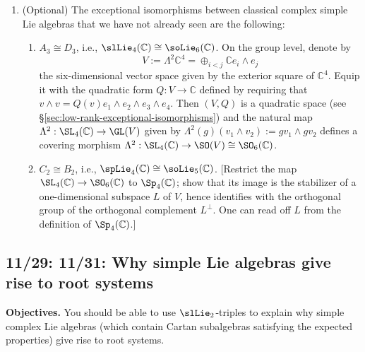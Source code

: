 \documentclass[reqno]{amsart} 
\begin{document}
\begin{homework}
\begin{enumerate}
  \item (Optional)
    The exceptional isomorphisms between
    classical complex simple Lie algebras
    that we have not already seen
    are the following:
    \begin{enumerate}
    \item $A_3 \cong D_3$, i.e.,
      $\slLie_4(\mathbb{C}) \cong \soLie_{6}(\mathbb{C})$.
      On the group level,
      denote by
      \begin{equation*}
      V := \Lambda^2 \mathbb{C}^4
      = \oplus_{i < j} \mathbb{C} e_i \wedge e_j
      \end{equation*}
      the six-dimensional vector space given by the exterior
      square of $\mathbb{C}^4$.  Equip it with the quadratic form
      $Q : V \rightarrow \mathbb{C}$
      defined by requiring that
      $v \wedge v = Q(v) e_1 \wedge e_2 \wedge e_3 \wedge e_4$.
      Then $(V,Q)$ is a quadratic space
      (see \S\ref{sec:low-rank-exceptional-isomorphisms})
      and the natural map
      $\Lambda^2 : \SL_4(\mathbb{C}) \rightarrow \GL(V)$
      given by $\Lambda^2(g) (v_1 \wedge v_2)
      := g v_1 \wedge g v_2$
      defines a covering morphism
      $\Lambda^2 : \SL_4(\mathbb{C}) \rightarrow \SO(V) \cong \SO_6(\mathbb{C})$.
    \item $C_2 \cong B_2$, i.e.,
      $\spLie_4(\mathbb{C}) \cong \soLie_{5}(\mathbb{C})$.
      [Restrict the map $\SL_4(\mathbb{C}) \rightarrow
      \SO_6(\mathbb{C})$
      to $\Sp_4(\mathbb{C})$;
      show that its image is the stabilizer of a one-dimensional
      subspace $L$ of $V$,
      hence identifies with the orthogonal group of the orthogonal
      complement $L^\perp$. 
      One can read off $L$ from the definition of $\Sp_4(\mathbb{C})$.]
    \end{enumerate}
  \end{enumerate}
\end{homework}

\newpage

\subsection{11/29: 11/31: Why simple Lie algebras give rise to root systems}
\label{sec:org6f2526e}
\textbf{Objectives.} You should be able to use $\slLie\textsubscript{2}$-triples to explain
why simple complex Lie algebras (which contain Cartan subalgebras
satisfying the expected properties) give rise to root systems.
\end{document}
